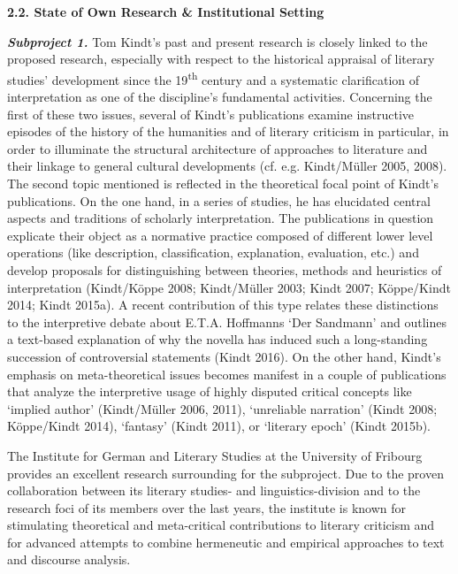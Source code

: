 
\vspace{.2cm}
\noindent\textbf{\large 2.2. State of Own Research \& Institutional Setting}
\vspace{.2cm}

\noindent \textbf{\emph{Subproject 1.}} Tom Kindt's past and present research is closely linked to the proposed research, especially with respect to the historical appraisal of literary studies' development since the 19\textsuperscript{th} century and a systematic clarification of interpretation as one of the discipline's fundamental activities. Concerning the first of these two issues, several of Kindt's publications examine instructive episodes of the history of the humanities and of literary criticism in particular, in order to illuminate the structural architecture of approaches to literature and their linkage to general cultural developments (cf. e.g. Kindt/M\"uller 2005, 2008). The second topic mentioned is reflected in the theoretical focal point of Kindt's publications. On the one hand, in a series of studies, he has elucidated central aspects and traditions of scholarly interpretation. The publications in question explicate their object as a normative practice composed of different lower level operations (like description, classification, explanation, evaluation, etc.) and develop proposals for distinguishing between theories, methods and heuristics of interpretation (Kindt/K\"oppe 2008; Kindt/M\"uller 2003; Kindt 2007; K\"oppe/Kindt 2014; Kindt 2015a). A recent contribution of this type relates these distinctions to the interpretive debate about E.T.A. Hoffmanns `Der Sandmann' and outlines a text-based explanation of why the novella has induced such a long-standing succession of controversial statements (Kindt 2016). On the other hand, Kindt's emphasis on meta-theoretical issues becomes manifest in a couple of publications that analyze the interpretive usage of highly disputed critical concepts like `implied author' (Kindt/M\"uller 2006, 2011), `unreliable narration' (Kindt 2008; K\"oppe/Kindt 2014), `fantasy' (Kindt 2011), or `literary epoch' (Kindt 2015b). 

The Institute for German and Literary Studies at the University of Fribourg provides an excellent research surrounding for the subproject. Due to the proven collaboration between its literary studies- and linguistics-division and to the research foci of its members over the last years, the institute is known for stimulating theoretical and meta-critical contributions to literary criticism and for advanced attempts to combine hermeneutic and empirical approaches to text and discourse analysis.


